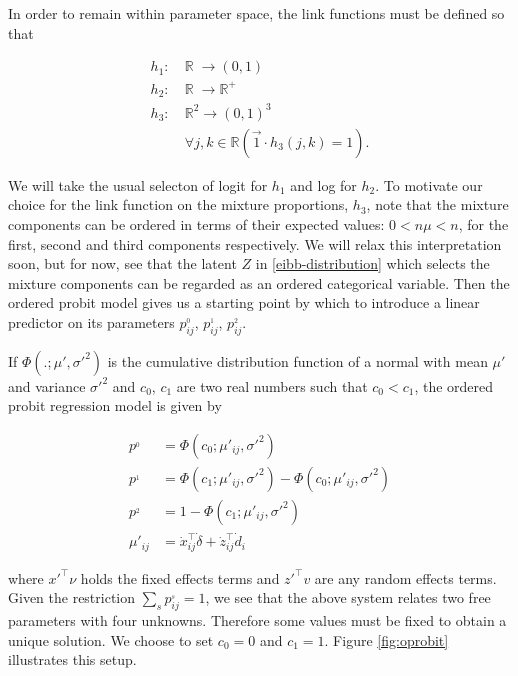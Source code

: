 In order to remain within parameter space, the link functions must be defined so that

\begin{equation}
\begin{split}
h_1:&\: \mathbb R\; \to (0,1)\\
h_2:&\: \mathbb R\; \to \mathbb R^+\\
h_3:&\: \mathbb R^2 \to (0,1)^3\\
&\: \forall j,k \in \mathbb R \left( \vec 1 \cdot h_3(j,k) = 1 \right).
\end{split}
\label{link-definitions}
\end{equation}

We will take the usual selecton of logit for $h_1$ and log for $h_2$. To motivate our choice for the link function on the mixture proportions, $h_3$, note that the mixture components can be ordered in terms of their expected values: $0<n\mu<n$, for the first, second and third components respectively. We will relax this interpretation soon, but for now, see that the latent $Z$ in \ref{eibb-distribution} which selects the mixture components can be regarded as an ordered categorical variable. Then the ordered probit model gives us a starting point by which to introduce a linear predictor on its parameters $p_{ij}^{_0}$, $p_{ij}^{_1}$, $p_{ij}^{_2}$.

If $\Phi(.;\mu',\sigma'^2)$ is the cumulative distribution function of a normal with mean $\mu'$ and variance $\sigma'^2$ and $c_0$, $c_1$ are two real numbers such that $c_0 < c_1$, the ordered probit regression model is given by

\begin{equation}
\begin{split}
p^{_0} &= \Phi(c_0;\mu'_{ij},\sigma'^{2}) \\
p^{_1} &= \Phi(c_1;\mu'_{ij},\sigma'^{2}) - \Phi(c_0;\mu'_{ij},\sigma'^{2})\\
p^{_2} &= 1 - \Phi(c_1;\mu'_{ij},\sigma'^{2})\\
\mu'_{ij} &= \dot{x}_{ij}^{\top} \dot{\delta}+\dot{z}_{ij}^{\top} \dot{d}_i
\end{split}
\label{eq:oprobit}
\end{equation}

where $x'^\top \nu$ holds the fixed effects terms and $z'^\top v$ are any random effects terms. Given the restriction $\sum_s p_{ij}^{_s} = 1$, we see that the above system relates two free parameters with four unknowns. Therefore some values must be fixed to obtain a unique solution. We choose to set $c_0 = 0$ and $c_1 = 1$. Figure \ref{fig:oprobit} illustrates this setup.

